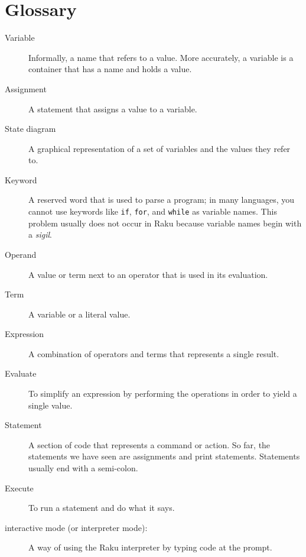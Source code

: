 \section{Glossary}

\begin{description}

\item[Variable]  Informally, a name that refers to a value. More 
accurately, a variable is a container that has a name and holds a value.

\item[Assignment]  A statement that assigns a value to a variable.

\item[State diagram]  A graphical representation of a set of variables and the
values they refer to.

\item[Keyword]  A reserved word that is used to parse a
program; in many languages, you cannot use keywords like 
{\tt if}, {\tt  for}, and {\tt while} as variable names. 
This problem usually does not occur in Raku because variable
names begin with a \emph{sigil}.

\item[Operand] A value or term next to an operator that 
is used in its evaluation.

\item[Term]  A variable or a literal value.

\item[Expression]  A combination of operators and terms that
represents a single result.

\item[Evaluate]  To simplify an expression by performing the operations
in order to yield a single value.

\item[Statement]  A section of code that represents a command or action.  So
far, the statements we have seen are assignments and print statements. Statements usually end with a semi-colon.

\item[Execute]  To run a statement and do what it says.

\item[interactive mode (or interpreter mode):] A way of using the Raku 
interpreter by typing code at the prompt.


\end{description}
